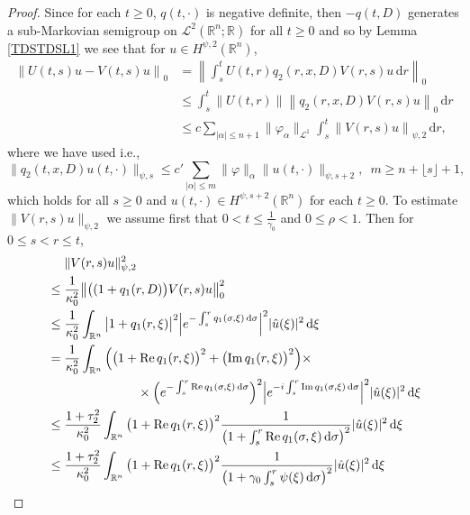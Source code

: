 \documentclass[a4paper, 12pt]{report}
\theoremstyle{remark}
\theoremstyle{definition}
\begin{document}
\begin{proof}
Since for each $t \ge 0$, $q(t, \cdot)$ is negative definite, then $-q(t, D)$ generates a sub-Markovian semigroup on $\mathcal{L}^2(\mathbb{R}^n; \mathbb{R})$ for all $t \ge 0$ and so by Lemma \ref{TDSTDSL1} we see that for $u \in H^{\psi, 2}(\mathbb{R}^n)$,
$$
\begin{aligned}
\left\|U(t, s)u - V(t, s)u\right\|_0 & = \left\|\int_s^tU(t, r)q_2(r, x, D)V(r, s)u\,\mathrm{d}r\right\|_0\\
& \le \int_s^t\left\|U(t, r)\right\|\left\|q_2(r, x, D)V(r, s)u\right\|_0\,\mathrm{d}r\\
& \le c\sum_{|\alpha| \le n + 1}\|\varphi_{\alpha}\|_{\mathcal{L}^1}\int_s^t\left\|V(r, s)u\right\|_{\psi, 2}\,\mathrm{d}r,
\end{aligned}
$$
where we have used \cite[Theorem 6.11]{RZ} i.e.,
$$
\|q_2(t, x, D)u(t, \cdot)\|_{\psi, s} \le c'\sum_{|\alpha| \le m}\|\varphi\|_\alpha\|u(t, \cdot)\|_{\psi, s + 2}, \,\,\, m \ge n + \lfloor s\rfloor + 1,
$$
which holds for all $s \ge 0$ and $u(t, \cdot) \in H^{\psi, s + 2}(\mathbb{R}^n)$ for each $t \ge 0$.  To estimate $\|V(r, s)u\|_{\psi, 2}$ we assume first that $0 < t \le \frac{1}{\gamma_0}$ and $0 \le \rho < 1$.  Then for $0 \le s < r \le t$,
$$
\begin{aligned}
& \,\,\,\,\,\,\,\, \|V(r, s)u\|_{\psi, 2}^2\\
& \le \frac{1}{\kappa_0^2}\big\|\big((1 + q_1(r, D)\big)V(r, s)u\big\|_0^2\\
& \le \frac{1}{\kappa_0^2}\int_{\mathbb{R}^n}\big|1 + q_1(r, \xi)\big|^2\Big|e^{-\int_s^rq_1(\sigma, \xi)\,\mathrm{d}\sigma}\Big|^2|\hat{u}(\xi)|^2\,\mathrm{d}\xi\\
& = \frac{1}{\kappa_0^2}\int_{\mathbb{R}^n}\Big(\big(1 + \text{Re}\,q_1(r, \xi)\big)^2 + \big(\text{Im}\,q_1(r, \xi)\big)^2\Big)\times\\
& \hspace{2.5cm} \times\Big(e^{-\int_s^r\text{Re}\,q_1(\sigma, \xi)\,\mathrm{d}\sigma}\Big)^2\Big|e^{-i\int_s^r\text{Im}\,q_1(\sigma, \xi)\,\mathrm{d}\sigma}\Big|^2|\hat{u}(\xi)|^2\,\mathrm{d}\xi\\
& \le \frac{1 + \tau_2^2}{\kappa_0^2}\int_{\mathbb{R}^n}\big(1 + \text{Re}\,q_1(r, \xi)\big)^2\frac{1}{\left(1 + \int_s^r\text{Re}\,q_1(\sigma, \xi)\,\mathrm{d}\sigma\right)^2}|\hat{u}(\xi)|^2\,\mathrm{d}\xi\\
& \le \frac{1 + \tau_2^2}{\kappa_0^2}\int_{\mathbb{R}^n}\big(1 + \text{Re}\,q_1(r, \xi)\big)^2\frac{1}{\left(1 + \gamma_0\int_s^r\psi(\xi)\,\mathrm{d}\sigma\right)^2}|\hat{u}(\xi)|^2\,\mathrm{d}\xi\\

\end{aligned}$$
\end{proof}
\end{document}
